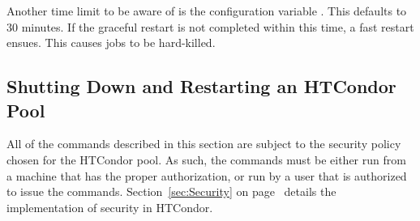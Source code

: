Another time limit to be aware of is the configuration variable 
. 
This defaults to 30 minutes. 
If the graceful restart is not completed within this time, 
a fast restart ensues. 
This causes jobs to be hard-killed. 

\subsection{\label{sec:Pool-Shutdown-and-Restart}
Shutting Down and Restarting an HTCondor Pool}

All of the commands described in this section are subject to the
security policy chosen for the HTCondor pool.
As such, the commands must be either run from a
machine that has the proper authorization, 
or run by a user that is authorized to issue the commands.
Section~\ref{sec:Security} on
page~\pageref{sec:Security} details the implementation of 
security in HTCondor.

